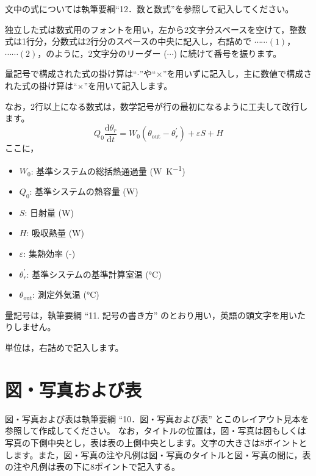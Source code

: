 \documentclass{shirobyoushi}
\begin{document}
文中の式については執筆要綱“12．数と数式”を参照して記入してください。

独立した式は数式用のフォントを用い，左から2文字分スペースを空けて，整数式は1行分，分数式は2行分のスペースの中央に記入し，右詰めで
$\cdots\cdots(1)$，$\cdots\cdots(2)$，のように，2文字分のリーダー
($\cdots$) に続けて番号を振ります。

量記号で構成された式の掛け算は“$\cdot$”や“$\times$”を用いずに記入し，主に数値で構成された式の掛け算は“$\times$”を用いて記入します。

なお，2行以上になる数式は，数学記号が行の最初になるように工夫して改行します。
%
\begin{equation}
  Q_0 \frac{\mathrm{d}\theta_r}{\mathrm{d}t}
  = W_0 (\theta_\mathrm{out}-\theta_r^\prime)+\varepsilon S + H
  \label{eq:heat}
\end{equation}
%
ここに，
\begin{itemize}
  \item[] $W_0$: 基準システムの総括熱通過量 \hfill (\unit{\watt\per\kelvin})
  \item[] $Q_0$: 基準システムの熱容量 \hfill (\unit{\watt})
  \item[] $S$: 日射量 \hfill (\unit{\watt})
  \item[] $H$: 吸収熱量 \hfill (\unit{\watt})
  \item[] $\varepsilon$: 集熱効率 \hfill (-)
  \item[] $\theta_r^\prime$: 基準システムの基準計算室温 \hfill (\unit{\celsius})
  \item[] $\theta_\mathrm{out}$: 測定外気温 \hfill (\unit{\celsius})
\end{itemize}

量記号は，執筆要綱 “11. 記号の書き方” のとおり用い，英語の頭文字を用いたりしません。

単位は，右詰めで記入します。

\section{図・写真および表}

図・写真および表は執筆要綱 “10．図・写真および表”
とこのレイアウト見本を参照して作成してください。
なお，タイトルの位置は，図・写真は図もしくは写真の下側中央とし，表は表の上側中央とします。文字の大きさは8ポイントとします。また，図・写真の注や凡例は図・写真のタイトルと図・写真の間に，表の注や凡例は表の下に8ポイントで記入する。
\end{document}
